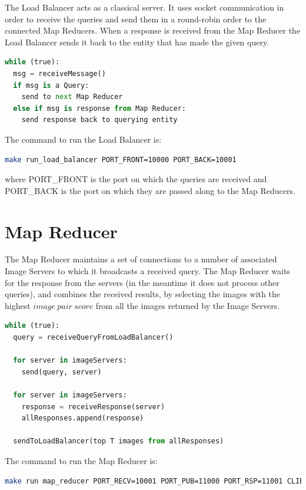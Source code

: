 The Load Balancer acts as a classical server. It uses socket communication in order to receive the queries and send them in a round-robin order to the connected Map Reducers. When a response is received from the Map Reducer the Load Balancer sends it back to the entity that has made the given query.\\

\begin{lstlisting}[language=python, caption=Load Balancer pseudocode]
while (true):
  msg = receiveMessage()
  if msg is a Query:
  	send to next Map Reducer
  else if msg is response from Map Reducer:
  	send response back to querying entity
\end{lstlisting}

The command to run the Load Balancer is:
\begin{lstlisting}[language=bash]
make run_load_balancer PORT_FRONT=10000 PORT_BACK=10001
\end{lstlisting}
where PORT_FRONT is the port on which the queries are received and PORT_BACK is the port on which they are passed along to the Map Reducers.

\section{Map Reducer}

The Map Reducer maintains a set of connections to a number of associated Image Servers to which it broadcasts a received query. The Map Reducer waits for the response from the servers (in the meantime it does not process other queries), and combines the received results, by selecting the images with the highest $image\ pair\ score$ from all the images returned by the Image Servers.\\

\begin{lstlisting}[language=python, caption=Map Reducer pseudocode]
while (true):
  query = receiveQueryFromLoadBalancer()
	
  for server in imageServers:
    send(query, server)
  
  for server in imageServers:
    response = receiveResponse(server)
    allResponses.append(response)
	
  sendToLoadBalancer(top T images from allResponses)
\end{lstlisting}

The command to run the Map Reducer is:
\begin{lstlisting}[language=bash]
make run map_reducer PORT_RECV=10001 PORT_PUB=11000 PORT_RSP=11001 CLIENTS=5
\end{lstlisting}

